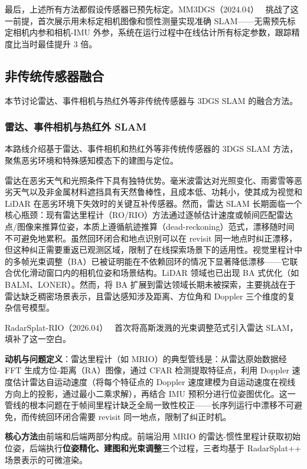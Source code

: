 最后，上述所有方法都假设传感器已预先标定。MM3DGS（2024.04）~\cite{2404_00923} 挑战了这一前提，首次展示用未标定相机图像和惯性测量实现准确 SLAM——无需预先标定相机内参和相机-IMU 外参，系统在运行过程中在线估计所有标定参数，跟踪精度比当时最佳提升 3 倍。

\subsection{非传统传感器融合}
\label{ss:15_5}

本节讨论雷达、事件相机与热红外等非传统传感器与 3DGS SLAM 的融合方法。

\subsubsection{雷达、事件相机与热红外 SLAM}

本路线介绍基于雷达、事件相机和热红外等非传统传感器的 3DGS SLAM 方法，聚焦恶劣环境和特殊感知模态下的建图与定位。

雷达在恶劣天气和光照条件下具有独特优势。毫米波雷达对光照变化、雨雾雪等恶劣天气以及非金属材料遮挡具有天然鲁棒性，且成本低、功耗小，使其成为视觉和 LiDAR 在恶劣环境下失效时的关键互补传感器。然而，雷达 SLAM 长期面临一个核心瓶颈：现有雷达里程计（RO/RIO）方法通过逐帧估计速度或帧间匹配雷达点/图像来推算位姿，本质上遵循航迹推算（dead-reckoning）范式，漂移随时间不可避免地累积。虽然回环闭合和地点识别可以在 revisit 同一地点时纠正漂移，但这种纠正需要重返已观测区域，限制了在线探索场景下的适用性。视觉里程计中的多帧光束调整（BA）已被证明能在不依赖回环的情况下显著降低漂移——它联合优化滑动窗口内的相机位姿和场景结构。LiDAR 领域也已出现 BA 式优化（如 BALM、LONER）。然而，将 BA 扩展到雷达领域长期未被探索，主要挑战在于雷达缺乏稠密场景表示，且雷达感知涉及距离、方位角和 Doppler 三个维度的复杂信号模型。

RadarSplat-RIO（2026.04）~\cite{2604_13492} 首次将高斯泼溅的光束调整范式引入雷达 SLAM，填补了这一空白。

\textbf{动机与问题定义}：雷达里程计（如 MRIO）的典型管线是：从雷达原始数据经 FFT 生成方位-距离（RA）图像，通过 CFAR 检测提取特征点，利用 Doppler 速度估计雷达自运动速度（将每个特征点的 Doppler 速度建模为自运动速度在视线方向上的投影，通过最小二乘求解），再结合 IMU 预积分进行位姿图优化。这一管线的根本问题在于帧间里程计缺乏全局一致性校正——长序列运行中漂移不可避免，而传统回环闭合需要 revisit 同一地点，限制了纠正时机。

\textbf{核心方法}由前端和后端两部分构成。前端沿用 MRIO 的雷达-惯性里程计获取初始位姿，后端执行\textbf{位姿精化、建图和光束调整}三个过程，三者均基于 RadarSplat++ 场景表示的可微渲染。

